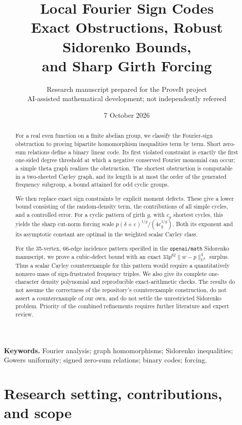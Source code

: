 \documentclass[11pt]{article}
\title{\textbf{Local Fourier Sign Codes}\\[5pt]
\large Exact Obstructions, Robust Sidorenko Bounds,\\
and Sharp Girth Forcing}
\author{Research manuscript prepared for the ProveIt project\\
\small AI-assisted mathematical development; not independently refereed}
\date{7 October 2026}
\numberwithin{equation}{section}
\theoremstyle{definition}
\theoremstyle{remark}
\newcommand{\eps}{\varepsilon}
\begin{document}
\maketitle
\begin{abstract}
For a real even function on a finite abelian group, we classify the
Fourier-sign obstruction to proving bipartite homomorphism inequalities
term by term. Short zero-sum relations define a binary linear code. Its
first violated constraint is exactly the first one-sided degree threshold
at which a negative conserved Fourier monomial can occur; a simple theta
graph realizes the obstruction. The shortest obstruction is computable in
a two-sheeted Cayley graph, and its length is at most the order of the
generated frequency subgroup, a bound attained for odd cyclic groups.

We then replace exact sign constraints by explicit moment defects. These
give a lower bound consisting of the random-density term, the contributions
of all simple cycles, and a controlled error. For a cyclic pattern of girth
$g$, with $c_g$ shortest cycles, this yields the sharp cut-norm forcing scale
$p(\delta+\eps)^{1/g}/(4c_g^{1/g})$. Both its exponent and its asymptotic
constant are optimal in the weighted scalar Cayley class.

For the 35-vertex, 66-edge incidence pattern specified in the
\texttt{openai/math} Sidorenko manuscript, we prove a cubic-defect bound
with an exact $33p^{62}\|w-p\|_{U^2}^4$ surplus. Thus a scalar Cayley
counterexample for this pattern would require a quantitatively nonzero
mass of sign-frustrated frequency triples. We also give its complete
one-character density polynomial and reproducible exact-arithmetic
checks. The results do not assume the correctness of the repository's
counterexample construction, do not assert a counterexample of our own,
and do not settle the unrestricted Sidorenko problem. Priority of the
combined refinements requires further literature and expert review.
\end{abstract}

\vspace{3pt}
\noindent\textbf{Keywords.} Fourier analysis; graph homomorphisms; Sidorenko inequalities;
Gowers uniformity; signed zero-sum relations; binary codes; forcing.

\clearpage
\setcounter{tocdepth}{1}
\tableofcontents
\clearpage

\section{Research setting, contributions, and scope}
\label{sec:intro}
\end{document}
